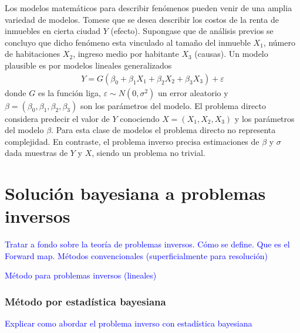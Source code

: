 Los modelos matemáticos para describir fenómenos pueden venir de una amplia variedad de modelos. Tomese que se desea describir los costos de la renta de inmuebles en cierta ciudad $Y$ (efecto). Supongase que de análisis previos se concluyo que dicho fenómeno esta vinculado al tamaño del inmueble $X_1$, número de habitaciones $X_2$, ingreso medio por habitante $X_3$ (causas). Un modelo plausible es por modelos lineales generalizados
\begin{align*}
    Y = G(\beta_0 + \beta_1 X_1 + \beta_2 X_2 + \beta_3 X_3) + \varepsilon
\end{align*}
donde $G$ es la función liga, $\varepsilon \sim N(0,\sigma^2)$ un error aleatorio y $\beta = (\beta_0, \beta_1, \beta_2, \beta_3)$ son los parámetros del modelo. El problema directo considera predecir el valor de $Y$ conociendo $X = (X_1,X_2,X_3)$ y los parámetros del modelo $\beta$. Para esta clase de modelos el problema directo no representa complejidad. En contraste, el problema inverso precisa estimaciones de $\beta$  y $\sigma$ dada muestras de $Y$ y $X$, siendo un problema no trivial. 





















\newpage

\section{Solución bayesiana a  problemas inversos}

\textcolor{blue}{Tratar a fondo sobre la teoría de problemas inversos. Cómo se define. Que es el Forward map. Métodos convencionales (superficialmente para resolución)}





\textcolor{blue}{
Método para problemas inversos (lineales)}

\subsubsection{Método por estadística bayesiana}
\textcolor{blue}{Explicar como abordar el problema inverso con estadística bayesiana}


